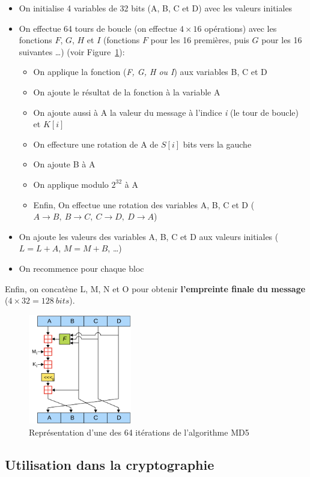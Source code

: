 \documentclass[12pt, a4paper]{article}
\begin{document}
\begin{itemize}
    \item On initialise 4 variables de 32 bits (A, B, C et D) avec les valeurs initiales
    \item On effectue 64 tours de boucle (on effectue $4 \times 16$ opérations) avec les fonctions $F$, $G$, $H$ et $I$
    (fonctions $F$ pour les 16 premières, puis $G$ pour les 16 suivantes \ldots) (voir Figure~\ref{md5_algo}):
    \begin{itemize}[label={\textbullet}]
        \item On applique la fonction (\textit{F, G, H ou I}) aux variables B, C et D
        \item On ajoute le résultat de la fonction à la variable A
        \item On ajoute aussi à A la valeur du message à l'indice \textit{i} (le tour de boucle) et $K[i]$
        \item On effecture une rotation de A de $S[i]$ bits vers la gauche
        \item On ajoute B à A
        \item On applique modulo $2^{32}$ à A
        \item Enfin, On effectue une rotation des variables A, B, C et D ($A \rightarrow B, \ B \rightarrow C, \ C \rightarrow D, \ D \rightarrow A$)
    \end{itemize}
    \item On ajoute les valeurs des variables A, B, C et D aux valeurs initiales ($L = L + A$, $M = M + B$, \ldots)
    \item On recommence pour chaque bloc
\end{itemize}
\bigskip
Enfin, on concatène L, M, N et O pour obtenir \textbf{l'empreinte finale du message} ($4 \times 32 = 128 \ bits$).
\bigskip
\begin{figure}[ht]
    \centering
    \includegraphics[width=0.4\textwidth]{../annexes/md5_algo.png}
    \caption{Représentation d'une des 64 itérations de l'algorithme MD5}\label{md5_algo}
\end{figure}

\subsection{Utilisation dans la cryptographie}
\end{document}
